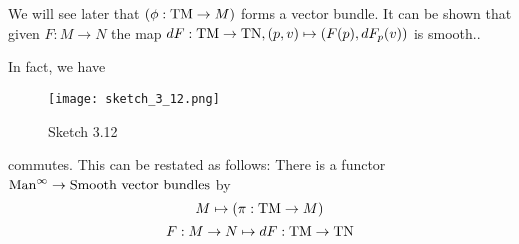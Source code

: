\begin{remark}
    We will see later %
    that \((\phi:{\text{TM}}\to M)\) forms a vector bundle. It can be shown that 
    given \(F:M\to N\) the map \(dF:{\text{TM}}\to\text{TN}, (p,v)\mapsto (F(p),dF_p(v))\) is smooth..

    In fact, we have 
    \begin{figure}[H]
        \centering
        \texttt{[image: sketch\_3\_12.png]}
        \caption{Sketch 3.12}
    \end{figure}
    commutes. This can be restated as follows: There is a functor \(\text{Man}^\infty\to\text{Smooth vector bundles}\)
    by \[M\mapsto (\pi:{\text{TM}}\to M)\]
    \[F:M\to N\mapsto dF: {\text{TM}} \to\text{TN}\]
\end{remark}




